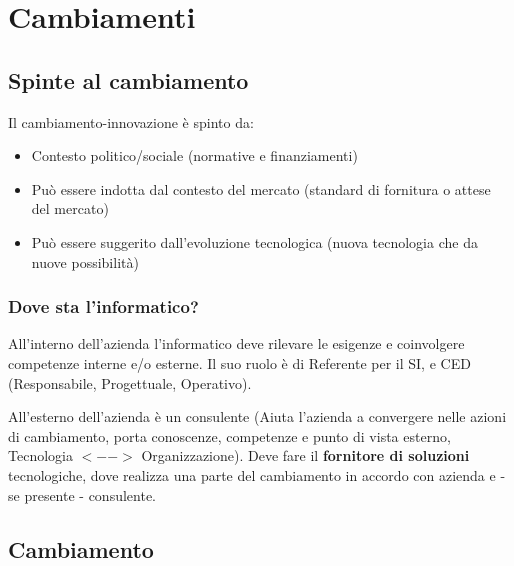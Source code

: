 \chapter{Cambiamenti}

\section{Spinte al cambiamento}

Il cambiamento-innovazione \`e spinto da:

\begin{itemize}
  \item
    Contesto politico/sociale (normative e finanziamenti)
  \item
    Pu\`o essere indotta dal contesto del mercato (standard di fornitura o attese
    del mercato)
  \item
    Pu\`o essere suggerito dall'evoluzione tecnologica (nuova tecnologia che da
    nuove possibilit\`a)
\end{itemize}


\subsection{Dove sta l'informatico?}

All'interno dell'azienda l'informatico deve rilevare le esigenze e coinvolgere competenze
interne e/o esterne. Il suo ruolo \`e di Referente per il SI, e CED
(Responsabile, Progettuale, Operativo).

All'esterno dell'azienda \`e un consulente (Aiuta l'azienda a convergere nelle
azioni di cambiamento, porta conoscenze, competenze e punto di vista esterno,
Tecnologia $<-->$ Organizzazione). Deve fare il \textbf{fornitore di soluzioni}
tecnologiche, dove realizza una parte del cambiamento in accordo con azienda
e - se presente - consulente.

\section{Cambiamento}

